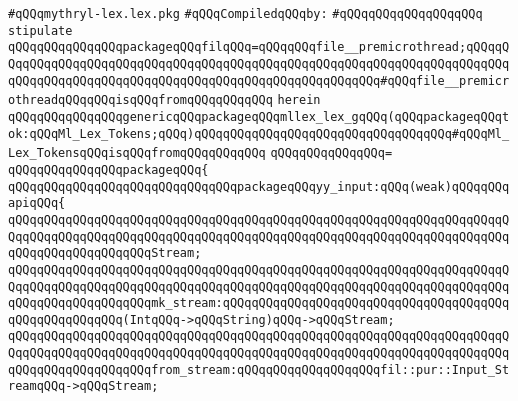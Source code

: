 \label{src/app/future-lex/src/frontends/lex/mythryl-lex.lex.pkg}
\verb|#qQQqmythryl-lex.lex.pkg|\newline
\newline
\verb|#qQQqCompiledqQQqby:|\newline
\verb|#qQQqqQQqqQQqqQQqqQQq|\newline
\newline
\newline
\verb|stipulate|\newline
\verb|qQQqqQQqqQQqqQQqpackageqQQqfilqQQq=qQQqqQQqfile__premicrothread;qQQqqQQqqQQqqQQqqQQqqQQqqQQqqQQqqQQqqQQqqQQqqQQqqQQqqQQqqQQqqQQqqQQqqQQqqQQqqQQqqQQqqQQqqQQqqQQqqQQqqQQqqQQqqQQqqQQqqQQqqQQqqQQq#qQQqfile__premicrothreadqQQqqQQqisqQQqfromqQQqqQQqqQQq|\newline
\verb|herein|\newline
\newline
\verb|qQQqqQQqqQQqqQQqgenericqQQqpackageqQQqmllex_lex_gqQQq(qQQqpackageqQQqtok:qQQqMl_Lex_Tokens;qQQq)qQQqqQQqqQQqqQQqqQQqqQQqqQQqqQQqqQQq#qQQqMl_Lex_TokensqQQqisqQQqfromqQQqqQQqqQQq|\newline
\verb|qQQqqQQqqQQqqQQq=|\newline
\verb|qQQqqQQqqQQqqQQqpackageqQQq{|\newline
\newline
\newline
\verb|qQQqqQQqqQQqqQQqqQQqqQQqqQQqqQQqpackageqQQqyy_input:qQQq(weak)qQQqqQQqapiqQQq{|\newline
\verb|qQQqqQQqqQQqqQQqqQQqqQQqqQQqqQQqqQQqqQQqqQQqqQQqqQQqqQQqqQQqqQQqqQQqqQQqqQQqqQQqqQQqqQQqqQQqqQQqqQQqqQQqqQQqqQQqqQQqqQQqqQQqqQQqqQQqqQQqqQQqqQQqqQQqqQQqqQQqqQQqStream;|\newline
\newline
\verb|qQQqqQQqqQQqqQQqqQQqqQQqqQQqqQQqqQQqqQQqqQQqqQQqqQQqqQQqqQQqqQQqqQQqqQQqqQQqqQQqqQQqqQQqqQQqqQQqqQQqqQQqqQQqqQQqqQQqqQQqqQQqqQQqqQQqqQQqqQQqqQQqqQQqqQQqqQQqqQQqmk_stream:qQQqqQQqqQQqqQQqqQQqqQQqqQQqqQQqqQQqqQQqqQQqqQQqqQQqqQQq(IntqQQq->qQQqString)qQQq->qQQqStream;|\newline
\verb|qQQqqQQqqQQqqQQqqQQqqQQqqQQqqQQqqQQqqQQqqQQqqQQqqQQqqQQqqQQqqQQqqQQqqQQqqQQqqQQqqQQqqQQqqQQqqQQqqQQqqQQqqQQqqQQqqQQqqQQqqQQqqQQqqQQqqQQqqQQqqQQqqQQqqQQqqQQqqQQqfrom_stream:qQQqqQQqqQQqqQQqqQQqfil::pur::Input_StreamqQQq->qQQqStream;|\newline
